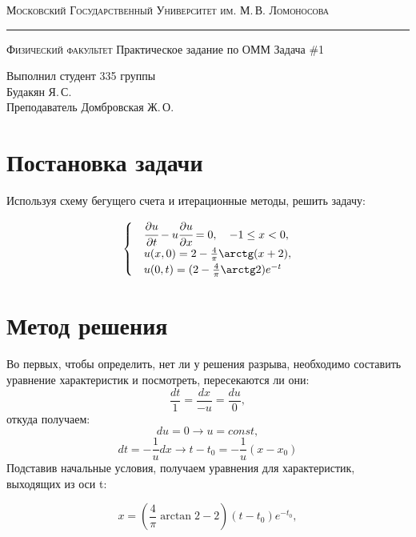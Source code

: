 \documentclass[12pt]{article}
\author{Будакян Я. С.}
\def\dd#1#2{\cfrac{\partial#1}{\partial#2}}
\begin{document}
	\begin{titlepage}
		\begin{center}
			{\small\textsc{Московский Государственный Университет им. М.\,В. Ломоносова}}
			\vskip 1pt \hrule \vskip 3pt
			{\small\textsc{Физический факультет}}
			\vfill
			{\Large Практическое задание по ОММ}
			\break
			\break
			{\Large Задача \#1}	
		\end{center}
		
		\vfill
		
		\begin{flushright}
			{Выполнил студент 335 группы\\Будакян Я.\,С.\\
			 Преподаватель Домбровская Ж.\,О.}
		\end{flushright}
	\end{titlepage}
	
	\section{Постановка задачи}
		\bigskip\par{}
		Используя схему бегущего счета и итерационные методы, решить задачу:
		
		\begin{equation}\label{eq:problem}
			\begin{cases}
				&\dd{u}t - u\dd{u}x = 0, \quad -1 \le x < 0, \\
				&u(x, 0) = 2 - \frac{4}{\pi}\arctg(x+2), \\
				&u(0, t) = (2 - \frac{4}{\pi}\arctg2)e^{-t}
			\end{cases}
		\end{equation}
	
	\section{Метод решения}
		Во первых, чтобы определить, нет ли у решения разрыва, необходимо составить уравнение характеристик и посмотреть, пересекаются ли они:
		$$ \frac{dt}{1} = \frac{dx}{-u} = \frac{du}{0},$$
		откуда получаем:
		$$ du = 0 \rightarrow u = const,$$
		$$ dt = -\frac{1}{u}dx \rightarrow t - t_0 = -\frac{1}{u}(x - x_0)$$
		Подставив начальные условия, получаем уравнения для характеристик, выходящих из оси t:
		
		\begin{equation}\label{char_t0}
			x = (\frac{4}{\pi}\arctan2-2)(t-t_0)e^{-t_0},
		\end{equation}
		
\end{document}
